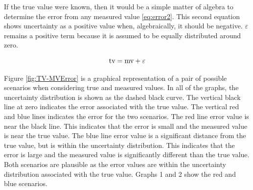 If the true value were known, then it would be a simple matter of algebra to determine the error from any measured value \ref{eq:error2}.  This second equation shows uncertainty as a positive value when, algebraically, it should be negative.  $ \varepsilon $ remains a positive term because it is assumed to be equally distributed around zero.

\begin{equation}
\label{eq:error2}
\textnormal{tv} = \textnormal{mv} + \varepsilon
\end{equation}

Figure \ref{fig:TV-MVError} is a graphical representation of a pair of possible scenarios when considering true and measured values.  In all of the graphs, the uncertainty distribution is shown as the dashed black curve.  The vertical black line at zero indicates the error associated with the true value.  The vertical red and blue lines indicates the error for the two scenarios.  The red line error value is near the black line.  This indicates that the error is small and the measured value is near the true value.  The blue line error value is a significant distance from the true value, but is within the uncertainty distribution.  This indicates that the error is large and the measured value is significantly different than the true value.  Both scenarios are plausible as the error values are within the uncertainty distribution associated with the true value.  Graphs 1 and 2 show the red and blue scenarios.
